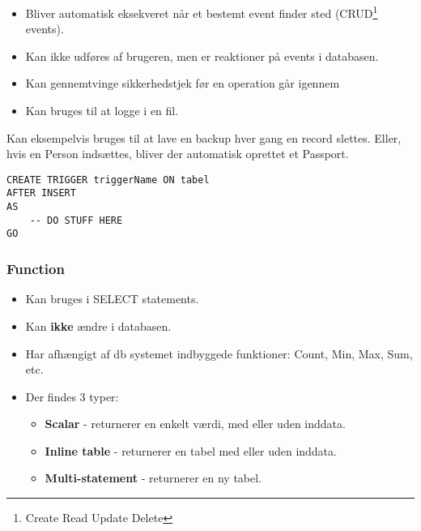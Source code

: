 \begin{itemize}
	\item Bliver automatisk eksekveret når et bestemt event finder sted (CRUD\footnote{Create Read Update Delete} events).
	\item Kan ikke udføres af brugeren, men er reaktioner på events i databasen.
	\item Kan gennemtvinge sikkerhedstjek før en operation går igennem
	\item Kan bruges til at logge i en fil.
%	
\end{itemize}

Kan eksempelvis bruges til at lave en backup hver gang en record slettes. Eller, hvis en Person indsættes, bliver der automatisk oprettet et Passport.

\begin{lstlisting}[caption=Kodeeksempel for Trigger]
CREATE TRIGGER triggerName ON tabel
AFTER INSERT
AS
	-- DO STUFF HERE
GO
\end{lstlisting}

\subsubsection{Function}

\begin{itemize}
	\item Kan bruges i SELECT statements.
	\item Kan \textbf{ikke} ændre i databasen.
	\item Har afhængigt af db systemet indbyggede funktioner: Count, Min, Max, Sum, etc.
	\item Der findes 3 typer:
	
	\begin{itemize}
		\item \textbf{Scalar} - returnerer en enkelt værdi, med eller uden inddata.
		\item \textbf{Inline table} - returnerer en tabel med eller uden inddata.
		\item \textbf{Multi-statement} - returnerer en ny tabel.
	\end{itemize}
\end{itemize}

